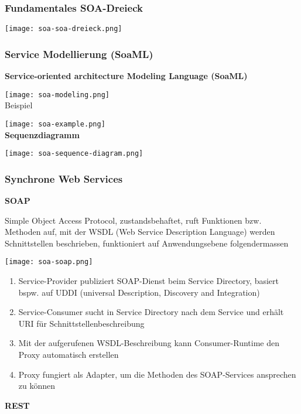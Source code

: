 \subsubsection{Fundamentales SOA-Dreieck}

\texttt{[image: soa-soa-dreieck.png]}

\columnbreak
\subsubsection{Service Modellierung (SoaML)}

\textbf{Service-oriented architecture Modeling Language (SoaML)}

\texttt{[image: soa-modeling.png]} \\

Beispiel

\texttt{[image: soa-example.png]} \\

\textbf{Sequenzdiagramm}

\texttt{[image: soa-sequence-diagram.png]}

\columnbreak
\subsubsection{Synchrone Web Services}

\textbf{SOAP}

Simple Object Access Protocol, zustandsbehaftet, ruft Funktionen bzw. Methoden auf, mit der WSDL (Web Service Description Language) werden Schnittstellen beschrieben, funktioniert auf Anwendungsebene folgendermassen

\texttt{[image: soa-soap.png]}

\begin{enumerate}
    \item Service-Provider publiziert SOAP-Dienst beim Service Directory, basiert bspw. auf UDDI (universal Description, Discovery and Integration)
    \item Service-Consumer sucht in Service Directory nach dem Service und erhält URI für Schnittstellenbeschreibung
    \item Mit der aufgerufenen WSDL-Beschreibung kann Consumer-Runtime den Proxy automatisch erstellen
    \item Proxy fungiert als Adapter, um die Methoden des SOAP-Services ansprechen zu können
\end{enumerate}
\vspace{10pt}
\textbf{REST}

